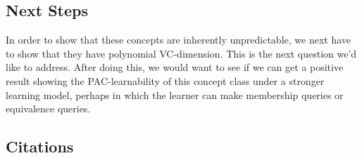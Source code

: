 \documentclass[]{article}
\begin{document}
\subsection{Next Steps}

In order to show that these concepts are inherently unpredictable, we next have to show that they have polynomial VC-dimension. This is the next question we'd like to address. After doing this, we would want to see if we can get a positive result showing the PAC-learnability of this concept class under a stronger learning model, perhaps in which the learner can make membership queries or equivalence queries.

\subsection{Citations}\label{citations}
\end{document}
